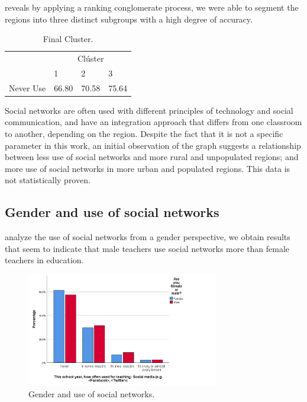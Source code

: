 \documentclass{textolivre}
\begin{document}
 reveals by applying a ranking conglomerate process, we were able to segment the regions into three distinct subgroups with a high degree of accuracy.

\begin{table}[htpb]
\caption{Final Cluster.}
\label{tbl-tabela-04}
\centering
\begin{tabularx}{0.5\linewidth}{XXXX}
\toprule 
& \multicolumn{3}{c}{Clúster} \\ 
& 1 & 2 & 3 \\ 
\midrule
Never Use & 66.80 & 70.58 & 75.64 \\
\bottomrule
\end{tabularx}
\end{table}

Social networks are often used with different principles of technology and social communication, and have an integration approach that differs from one classroom to another, depending on the region. Despite the fact that it is not a specific parameter in this work, an initial observation of the graph suggests a relationship between less use of social networks and more rural and unpopulated regions; and more use of social networks in more urban and populated regions. This data is not statistically proven.

\subsection{Gender and use of social networks}\label{sec-gender}

 analyze the use of social networks from a gender perspective, we obtain results that seem to indicate that male teachers use social networks more than female teachers in education.

\begin{figure}[htbp]
 \centering
 \includegraphics[width=0.75\textwidth]{fig03}
 \caption{Gender and use of social networks.}
 \label{fig03}
\end{figure}
\end{document}
